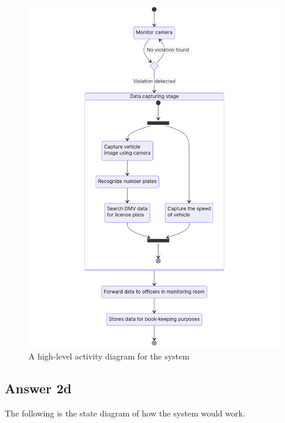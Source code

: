 \documentclass[
  11pt, %
]{assignment}
\begin{document}
\begin{figure}[h!]
  \centering
  \includegraphics[width=\linewidth]{graphics/activity.png}
  \caption{A high-level activity diagram for the system}
\end{figure}

\pagebreak

\subsection*{Answer 2d}

The following is the state diagram of how the system would work.
\end{document}
